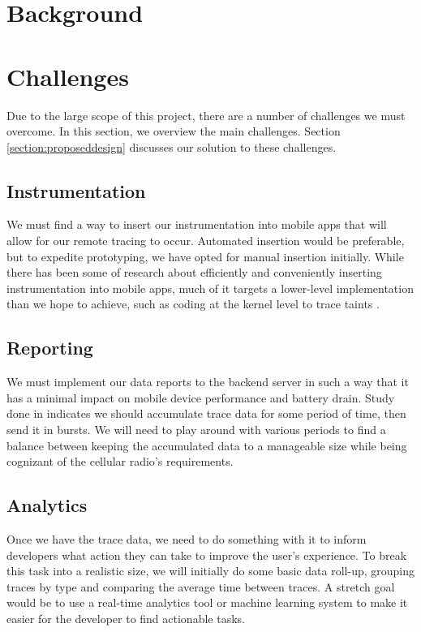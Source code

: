 \documentclass{acm_proc_article-sp}
\begin{document}
\section{Background}


\section{Challenges}
Due to the large scope of this project, there are a number of challenges we must overcome.
In this section, we overview the main challenges. Section \ref{section:proposeddesign} discusses
our solution to these challenges.

\subsection{Instrumentation}
We must find a way to insert our instrumentation into mobile apps that will
allow for our remote tracing to occur. Automated insertion would be preferable,
but to expedite prototyping, we have opted for manual insertion initially.
While there has been some of research about efficiently and conveniently inserting
instrumentation into mobile apps, much of it targets a lower-level implementation than
we hope to achieve, such as coding at the kernel level to trace taints \cite{TaintDroid}.

\subsection{Reporting}
We must implement our data reports to the backend server in such a way that it
has a minimal impact on mobile device performance and battery drain. Study done
in \cite{PeriodicTransfers} indicates we should accumulate trace data for some
period of time, then send it in bursts. We will need to play around with various
periods to find a balance between keeping the accumulated data to a manageable
size while being cognizant of the cellular radio's requirements.

\subsection{Analytics}
Once we have the trace data, we need to do something with it to inform developers
what action they can take to improve the user's experience. To break this task
into a realistic size, we will initially do some basic data roll-up, grouping
traces by type and comparing the average time between traces. A stretch goal
would be to use a real-time analytics tool or machine learning system 
to make it easier for the developer to find actionable tasks.
\end{document}

